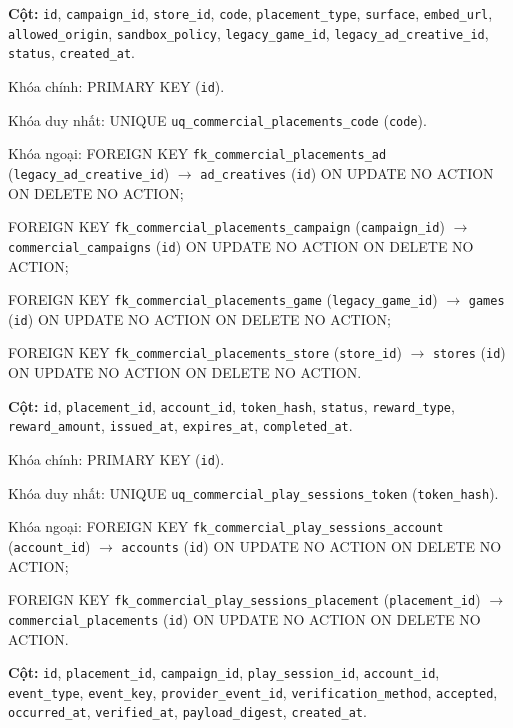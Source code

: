 \begin{description}[leftmargin=3.6cm,labelwidth=3.4cm,style=nextline]
\item[\texttt{commercial\_placements}] \textbf{Cột:} \texttt{id}, \texttt{campaign\_id}, \texttt{store\_id}, \texttt{code}, \texttt{placement\_type}, \texttt{surface}, \texttt{embed\_url}, \texttt{allowed\_origin}, \texttt{sandbox\_policy}, \texttt{legacy\_game\_id}, \texttt{legacy\_ad\_creative\_id}, \texttt{status}, \texttt{created\_at}.

Khóa chính: PRIMARY KEY (\texttt{id}).

Khóa duy nhất: UNIQUE \texttt{uq\_commercial\_placements\_code} (\texttt{code}).

Khóa ngoại: FOREIGN KEY \texttt{fk\_commercial\_placements\_ad} (\texttt{legacy\_ad\_creative\_id}) $\rightarrow$ \texttt{ad\_creatives} (\texttt{id}) ON UPDATE NO ACTION ON DELETE NO ACTION;\par FOREIGN KEY \texttt{fk\_commercial\_placements\_campaign} (\texttt{campaign\_id}) $\rightarrow$ \texttt{commercial\_campaigns} (\texttt{id}) ON UPDATE NO ACTION ON DELETE NO ACTION;\par FOREIGN KEY \texttt{fk\_commercial\_placements\_game} (\texttt{legacy\_game\_id}) $\rightarrow$ \texttt{games} (\texttt{id}) ON UPDATE NO ACTION ON DELETE NO ACTION;\par FOREIGN KEY \texttt{fk\_commercial\_placements\_store} (\texttt{store\_id}) $\rightarrow$ \texttt{stores} (\texttt{id}) ON UPDATE NO ACTION ON DELETE NO ACTION.

\item[\texttt{commercial\_play\_sessions}] \textbf{Cột:} \texttt{id}, \texttt{placement\_id}, \texttt{account\_id}, \texttt{token\_hash}, \texttt{status}, \texttt{reward\_type}, \texttt{reward\_amount}, \texttt{issued\_at}, \texttt{expires\_at}, \texttt{completed\_at}.

Khóa chính: PRIMARY KEY (\texttt{id}).

Khóa duy nhất: UNIQUE \texttt{uq\_commercial\_play\_sessions\_token} (\texttt{token\_hash}).

Khóa ngoại: FOREIGN KEY \texttt{fk\_commercial\_play\_sessions\_account} (\texttt{account\_id}) $\rightarrow$ \texttt{accounts} (\texttt{id}) ON UPDATE NO ACTION ON DELETE NO ACTION;\par FOREIGN KEY \texttt{fk\_commercial\_play\_sessions\_placement} (\texttt{placement\_id}) $\rightarrow$ \texttt{commercial\_placements} (\texttt{id}) ON UPDATE NO ACTION ON DELETE NO ACTION.

\item[\texttt{commercial\_events}] \textbf{Cột:} \texttt{id}, \texttt{placement\_id}, \texttt{campaign\_id}, \texttt{play\_session\_id}, \texttt{account\_id}, \texttt{event\_type}, \texttt{event\_key}, \texttt{provider\_event\_id}, \texttt{verification\_method}, \texttt{accepted}, \texttt{occurred\_at}, \texttt{verified\_at}, \texttt{payload\_digest}, \texttt{created\_at}.


\end{description}
